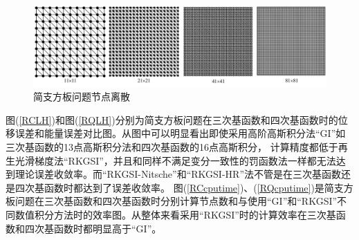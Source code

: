 \begin{figure}[H]
\centering
      \includegraphics[scale=0.4]{figure/PHR/R/rectangularmsh.png}
    \caption{简支方板问题节点离散}\label{rectangularmsh}
\end{figure}
 图(\ref{RCLH})和图(\ref{RQLH})分别为简支方板问题在三次基函数和四次基函数时的位移误差和能量误差对比图。从图中可以明显看出即使采用高阶高斯积分法“GI”如三次基函数的13点高斯积分法和四次基函数的16点高斯积分，
计算精度都低于再生光滑梯度法“RKGSI”，并且和同样不满足变分一致性的罚函数法一样都无法达到理论误差收敛率。而“RKGSI-Nitsche”和“RKGSI-HR”法不管是在三次基函数还是四次基函数时都达到了误差收敛率。
图(\ref{RCcputime})、(\ref{RQcputime})是简支方板问题在三次基函数和四次基函数时分别计算节点数和与使用“GI”和“RKGSI”不同数值积分方法时的效率图。从整体来看采用“RKGSI”时的计算效率在三次基函数和四次基函数时都明显高于“GI”。  

